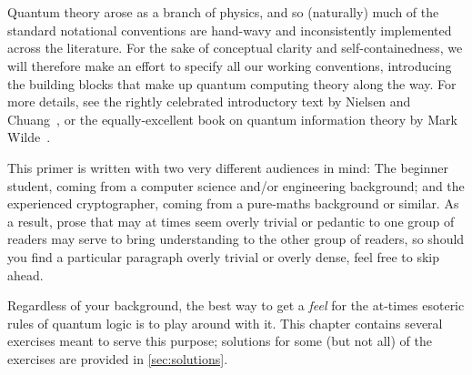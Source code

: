 \section{\titlePrimer}\label{sec:primer}
  Quantum theory arose as a branch of physics, and so (naturally) much of the
    standard notational conventions are hand-wavy and inconsistently
    implemented across the literature. For the sake of conceptual clarity and
    self-containedness, we will therefore make an effort to specify all our
    working conventions, introducing the
    building blocks that make up quantum computing theory along the way.
    For more details, see the rightly celebrated introductory text by Nielsen and
    Chuang~\cite{NieChu10}, or the equally-excellent book on quantum
    information theory by Mark Wilde~\cite{Wilde17}.


  This primer is written with two very different audiences in mind: The beginner
    student, coming from a computer science and/or engineering background; and
    the experienced cryptographer, coming from a pure-maths background or
    similar. As a result, prose that may at times seem overly trivial or
    pedantic to one group of readers may serve to bring understanding to
    the other group of readers, so should you find a particular paragraph overly
    trivial or overly dense, feel free to skip ahead.

  Regardless of your background, the best way to get a \emph{feel} for the
    at-times esoteric rules of quantum logic is to play
    around with it. This chapter contains several exercises meant to serve this purpose;
    solutions for some (but not all) of the exercises are provided in
    \cref{sec:solutions}.

